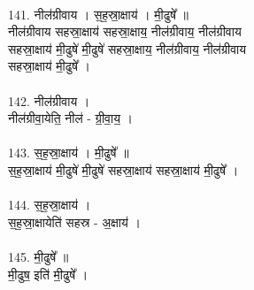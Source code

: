 \\
141. नील॑ग्रीवाय । स॒ह॒स्रा॒क्षाय॑ । मी॒ढुषे᳚ ॥\\
नील॑ग्रीवाय सहस्रा॒क्षाय॑ सहस्रा॒क्षाय॒ नील॑ग्रीवाय॒ नील॑ग्रीवाय\\
सहस्रा॒क्षाय॑ मी॒ढुषे॑ मी॒ढुषे॑ सहस्रा॒क्षाय॒ नील॑ग्रीवाय॒ नील॑ग्रीवाय\\
सहस्रा॒क्षाय॑ मी॒ढुषे᳚ ।\\
\\
142. नील॑ग्रीवाय ।\\
नील॑ग्रीवा॒येति॒ नील॑ - ग्री॒वा॒य॒ ।\\
\\
143. स॒ह॒स्रा॒क्षाय॑ । मी॒ढुषे᳚ ॥\\
स॒ह॒स्रा॒क्षाय॑ मी॒ढुषे॑ मी॒ढुषे॑ सहस्रा॒क्षाय॑ सहस्रा॒क्षाय॑ मी॒ढुषे᳚ ।\\
\\
144. स॒ह॒स्रा॒क्षाय॑ ।\\
स॒ह॒स्रा॒क्षायेति॑ सहस्र - अ॒क्षाय॑ ।\\
\\
145. मी॒ढुषे᳚ ॥\\
मी॒ढुष॒ इति॑ मी॒ढुषे᳚ ।\\
\\
